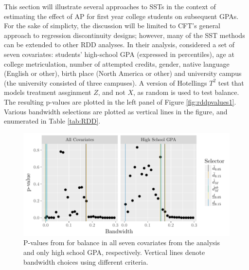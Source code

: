 \documentclass[12pt]{article}\usepackage[]{graphicx}\usepackage[]{color}
\makeatletter
\def\maxwidth{ %
  \ifdim\Gin@nat@width>\linewidth
    \linewidth
  \else
    \Gin@nat@width
  \fi
}
\newenvironment{knitrout}{}{} %
\makeatother
\begin{document}
This section will illustrate several approaches to SSTs in the context
of estimating the effect of AP for first year college students on
subsequent GPAs.
For the sake of simplicty, the discussion will be limited to CFT's
general approach to regression discontinuity designs; however, many of
the SST methods can be extended to other RDD analyses.
In their analysis, \citet{lso} considered a set of seven covariates:
students' high-school GPA (expressed in percentiles), age at college
metriculation, number of attempted credits, gender, native language
(English or other), birth place (North America or other) and
university campus (the university consisted of three campuses).
A version of Hotellings $T^2$ test that models
treatment assginment $Z$, and not $X$, as random \citep{hansenBowers}
is used to test balance.
The resulting p-values are plotted in the left panel of Figure \ref{fig:rddpvalues1}.
Various bandwidth selections are plotted as vertical lines in the
figure, and enumerated in Table \ref{tab:RDD}.

\begin{figure}
\begin{knitrout}
\color{fgcolor}
\includegraphics[width=\maxwidth]{figure/rdd-1} 

\end{knitrout}
\caption{P-values from for balance in all seven covariates
  from the \citet{lso} analysis and only high school GPA,
  respectively. Vertical lines denote bandwidth choices using
  different criteria.}
\label{fig:rdpvalues1}
\end{figure}
\end{document}

